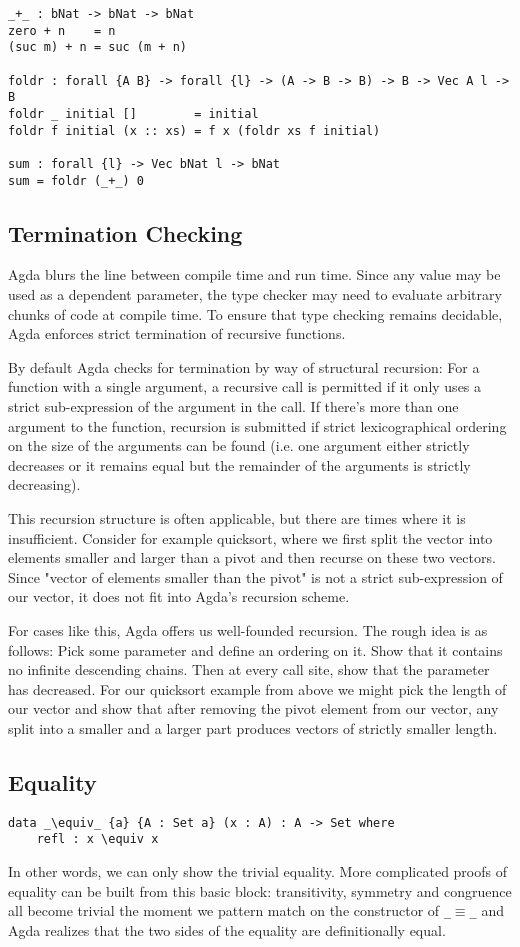 \begin{lstlisting}[caption={Functions},label={lst:tutorial:functional}]
_+_ : bNat -> bNat -> bNat
zero + n    = n
(suc m) + n = suc (m + n)

foldr : forall {A B} -> forall {l} -> (A -> B -> B) -> B -> Vec A l -> B
foldr _ initial []        = initial
foldr f initial (x :: xs) = f x (foldr xs f initial)

sum : forall {l} -> Vec bNat l -> bNat
sum = foldr (_+_) 0
\end{lstlisting}

\subsection{Termination Checking}
Agda blurs the line between compile time and run time. Since any value may be used as a dependent parameter, the type checker may need to evaluate arbitrary chunks of code at compile time. To ensure that type checking remains decidable, Agda enforces strict termination of recursive functions.

By default Agda checks for termination by way of structural recursion: For a function with a single argument, a recursive call is permitted if it only uses a strict sub-expression of the argument in the call. If there's more than one argument to the function, recursion is submitted if strict lexicographical ordering on the size of the arguments can be found (i.e. one argument either strictly decreases or it remains equal but the remainder of the arguments is strictly decreasing).

This recursion structure is often applicable, but there are times where it is insufficient. Consider for example quicksort, where we first split the vector into elements smaller and larger than a pivot and then recurse on these two vectors. Since "vector of elements smaller than the pivot" is not a strict sub-expression of our vector, it does not fit into Agda's recursion scheme.

For cases like this, Agda offers us well-founded recursion. The rough idea is as follows: Pick some parameter and define an ordering on it. Show that it contains no infinite descending chains. Then at every call site, show that the parameter has decreased. For our quicksort example from above we might pick the length of our vector and show that after removing the pivot element from our vector, any split into a smaller and a larger part produces vectors of strictly smaller length.

\subsection{Equality}
\begin{lstlisting}[caption={Equality in Agda},label={lst:tutorial:equality}]
data _\equiv_ {a} {A : Set a} (x : A) : A -> Set where
    refl : x \equiv x
\end{lstlisting}

In other words, we can only show the trivial equality. More complicated proofs of equality can be built from this basic block: transitivity, symmetry and congruence all become trivial the moment we pattern match on the constructor of \texttt{\_$\equiv$\_} and Agda realizes that the two sides of the equality are definitionally equal.